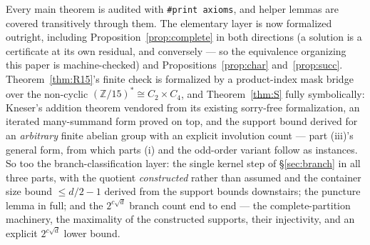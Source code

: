 \documentclass[11pt]{article}
\theoremstyle{plain}
\theoremstyle{remark}
\theoremstyle{plain}
\numberwithin{equation}{section}
\begin{document}
Every main theorem is audited with \texttt{\#print axioms}, and
helper lemmas are covered transitively through them. The elementary
layer is now formalized outright, including
Proposition~\ref{prop:complete} in both directions (a solution is a
certificate at its own residual, and conversely --- so the
equivalence organizing this paper is machine-checked) and
Propositions~\ref{prop:char} and~\ref{prop:succ}. Theorem~\ref{thm:R15}'s
finite check is formalized by a product-index mask bridge over the
non-cyclic $(\mathbb{Z}/15)^* \cong C_2 \times C_4$, and
Theorem~\ref{thm:S} fully symbolically: Kneser's addition theorem
vendored from its existing sorry-free formalization, an iterated
many-summand form proved on top, and the support bound derived for
an \emph{arbitrary} finite abelian group with an explicit involution
count --- part (iii)'s general form, from which parts (i) and the
odd-order variant follow as instances. So too the
branch-classification layer:
the single kernel step of \S\ref{sec:branch} in all three parts,
with the quotient \emph{constructed} rather than assumed and the
container size bound $\le d/2 - 1$ derived from the support bounds
downstairs; the puncture lemma in full; and the
$2^{c\sqrt d}$ branch count end to end --- the complete-partition
machinery, the maximality of the constructed supports, their
injectivity, and an explicit $2^{c\sqrt d}$ lower bound.
\end{document}
